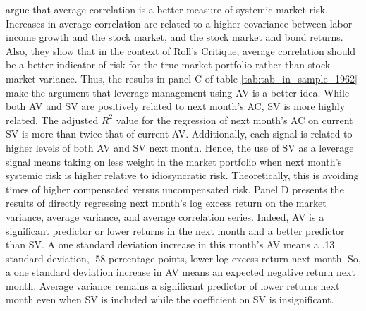 \citet{pollet_average_2010} argue that average correlation is a better measure of systemic market risk. Increases in average correlation are related to a higher covariance between labor income growth and the stock market, and the stock market and bond returns. Also, they show that in the context of Roll’s Critique, average correlation should be a better indicator of risk for the true market portfolio rather than stock market variance. \citep{roll_critique_1977} Thus, the results in panel C of table \ref{tab:tab_in_sample_1962} make the argument that leverage management using AV is a better idea. While both AV and SV are positively related to next month’s AC, SV is more highly related. The adjusted $R^{2}$ value for the regression of next month’s AC on current SV is more than twice that of current AV. Additionally, each signal is related to higher levels of both AV and SV next month. Hence, the use of SV as a leverage signal means taking on less weight in the market portfolio when next month’s systemic risk is higher relative to idiosyncratic risk. Theoretically, this is avoiding times of higher compensated versus uncompensated risk. Panel D presents the results of directly regressing next month’s log excess return on the market variance, average variance, and average correlation series. Indeed, AV is a significant predictor or lower returns in the next month and a better predictor than SV. A one standard deviation increase in this month’s AV means a .13 standard deviation, .58 percentage points, lower log excess return next month. So, a one standard deviation increase in AV means an expected negative return next month. Average variance remains a significant predictor of lower returns next month even when SV is included while the coefficient on SV is insignificant.



